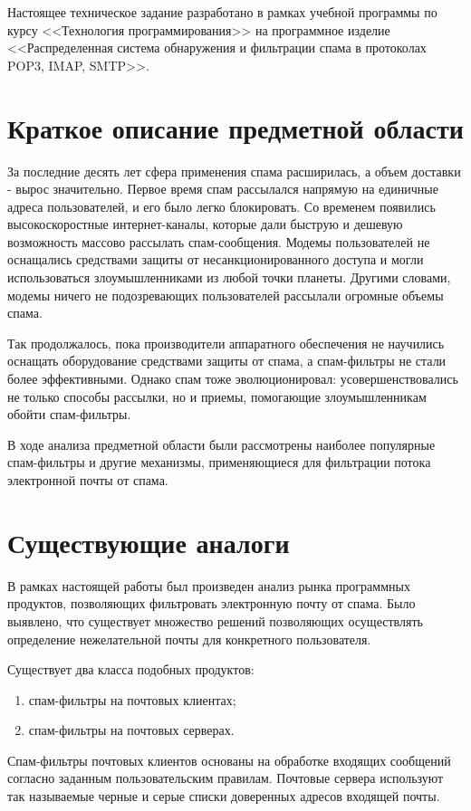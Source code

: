 \Introduction
Настоящее техническое задание разработано в рамках учебной программы по курсу <<Технология программирования>> на программное изделие <<Распределенная система обнаружения и фильтрации спама в протоколах POP3, IMAP, SMTP>>.


\section{Краткое описание предметной области}
За последние десять лет сфера применения спама расширилась, а объем доставки - вырос значительно. Первое время спам рассылался напрямую на единичные адреса пользователей, и его было легко блокировать. Со временем появились высокоскоростные интернет-каналы, которые дали быструю и дешевую возможность массово рассылать спам-сообщения. Модемы пользователей не оснащались средствами защиты от несанкционированного доступа и могли использоваться злоумышленниками из любой точки планеты. Другими словами, модемы ничего не подозревающих пользователей рассылали огромные объемы спама.

Так продолжалось, пока производители аппаратного обеспечения не научились оснащать оборудование средствами защиты от спама, а спам-фильтры не стали более эффективными. Однако спам тоже эволюционировал: усовершенствовались не только способы рассылки, но и приемы, помогающие злоумышленникам обойти спам-фильтры. 

В ходе анализа предметной области были рассмотрены наиболее популярные спам-фильтры и другие механизмы, применяющиеся для фильтрации потока электронной почты от спама.



\section{Существующие аналоги}
В рамках настоящей работы был произведен анализ рынка программных продуктов, позволяющих фильтровать электронную почту от спама. Было выявлено, что существует множество решений позволяющих осуществлять определение нежелательной почты для конкретного пользователя. 

Существует два класса подобных продуктов:
\begin{enumerate}
	\item спам-фильтры на почтовых клиентах;
	\item спам-фильтры на почтовых серверах. 
\end{enumerate}

Спам-фильтры почтовых клиентов основаны на обработке входящих сообщений согласно заданным пользовательским правилам.  Почтовые сервера используют так называемые черные и серые списки доверенных адресов входящей почты.

